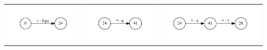 \begin{table}[h]
  \centering
  \begin{tabular}{ | c | c | c |}
    \hline
    \begin{minipage}{.3\textwidth}
      \includegraphics[width=\linewidth]{Polubelova/0_int}
    \end{minipage}
    &
    \begin{minipage}{.3\textwidth}
      \includegraphics[width=\linewidth]{Polubelova/24_int}
    \end{minipage}
    & 
    \begin{minipage}{.3\textwidth}
      \includegraphics[width=\linewidth]{Polubelova/24_1_int}
    \end{minipage}

\end{tabular}
\end{table}
